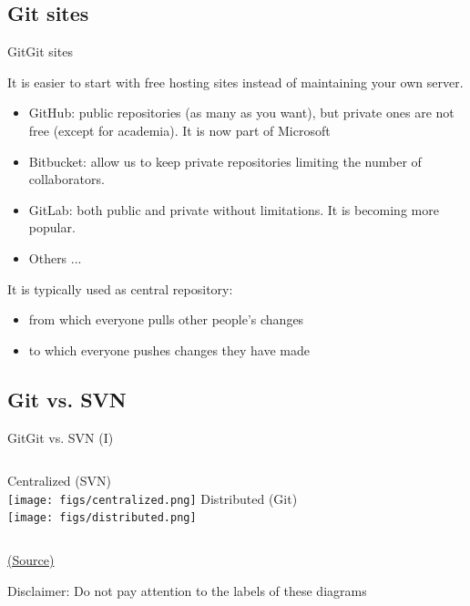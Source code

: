\documentclass[10pt,compress]{beamer} %
\begin{document}
\subsection{Git sites}
\begin{frame}{Git}{Git sites}


It is easier to start with free hosting sites instead of maintaining your own server.

\begin{itemize}
\item \alert{GitHub}: public repositories (as many as you want), but private ones are not free (except for academia). It is now part of Microsoft
 \item \alert{Bitbucket}: allow us to keep private repositories limiting the number of collaborators.
 \item \alert{GitLab}: both public and private without limitations. It is becoming more popular.
 \item Others ...
\end{itemize}

It is typically used as central repository:
\begin{itemize}
 \item from which everyone pulls other people’s changes
 \item to which everyone pushes changes they have made
\end{itemize}

\end{frame}

\subsection{Git vs. SVN}

\begin{frame}{Git}{Git vs. SVN (I)}
\begin{center}
\begin{columns}
	\centering Centralized (SVN)\\\smallskip
\texttt{[image: figs/centralized.png]}
	\centering Distributed (Git)\\\smallskip
\texttt{[image: figs/distributed.png]}
\end{columns}

\tiny \href{http://softwareengineering.stackexchange.com/questions/35074/im-a-subversion-geek-why-should-i-consider-or-not-consider-mercurial-or-git-or}{(Source)}
\end{center}
	Disclaimer: Do not pay attention to the labels of these diagrams
\end{frame}
\end{document}
